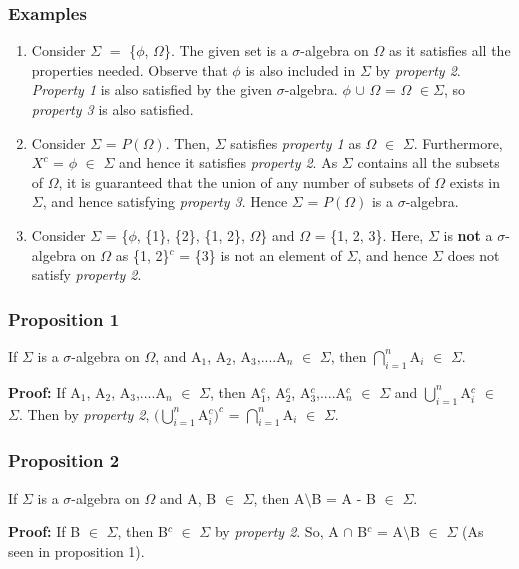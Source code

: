 \documentclass{article}
\begin{document}
\subsubsection{Examples}
\begin{enumerate}
	\item Consider $\Sigma$ $=$ \{$\phi$, $\Omega$\}. The given set is a $\sigma$-algebra on $\Omega$ as it satisfies all the properties needed. Observe that $\phi$ is also included in $\Sigma$ by \textit{property 2}. \textit{Property 1} is also satisfied by the given $\sigma$-algebra. $\phi $ $\cup$ $\Omega$ = $\Omega$ $\in \Sigma$, so \textit{property 3} is also satisfied.
	\item Consider $\Sigma$ = $P(\Omega)$. Then, $\Sigma$ satisfies \textit{property 1} as $\Omega$ $\in$ $\Sigma$. Furthermore, $X^c$ = $\phi$ $\in$ $\Sigma$ and hence it satisfies \textit{property 2}. As $\Sigma$ contains all the subsets of $\Omega$, it is guaranteed that the union of any number of subsets of $\Omega$ exists in $\Sigma$, and hence satisfying \textit{property 3}. Hence $\Sigma$ = $P(\Omega)$ is a $\sigma$-algebra. 
	\item Consider $\Sigma$ = \{$\phi$, \{1\}, \{2\}, \{1, 2\}, $\Omega$\} and $\Omega$ = \{1, 2, 3\}. Here, $\Sigma$ is \textbf{not} a $\sigma$-algebra on $\Omega$ as \{1, 2\}$^c$ = \{3\} is not an element of $\Sigma$, and hence $\Sigma$ does not satisfy \textit{property 2}.
\end{enumerate}


\subsubsection{Proposition 1}
If $\Sigma$ is a $\sigma$-algebra on $\Omega$, and A$_1$, A$_2$, A$_3$,....A$_n$ $\in$ $\Sigma$, then $\bigcap\limits_{i=1}^n$A$_i$ $\in$ $\Sigma$.

\textbf{Proof: }If A$_1$, A$_2$, A$_3$,....A$_n$ $\in$ $\Sigma$, then A$_1^c$, A$_2^c$, A$_3^c$,....A$_n^c$ $\in$ $\Sigma$ and $\bigcup\limits_{i=1}^n$A$_i^c$ $\in$ $\Sigma$. Then by \textit{property 2}, $(\bigcup\limits_{i=1}^n$A$_i^c)^c$ = $\bigcap\limits_{i=1}^n$A$_i$ $\in$ $\Sigma$.


\subsubsection{Proposition 2}
If $\Sigma$ is a $\sigma$-algebra on $\Omega$ and A, B $\in$ $\Sigma$, then A$\setminus$B = A - B $\in$ $\Sigma$.

\textbf{Proof: }If B $\in$ $\Sigma$, then B$^c$ $\in$ $\Sigma$ by  \textit{property 2}. So, A $\cap$ B$^c$ = A$\setminus$B $\in$ $\Sigma$ (As seen in proposition 1).
\end{document}

